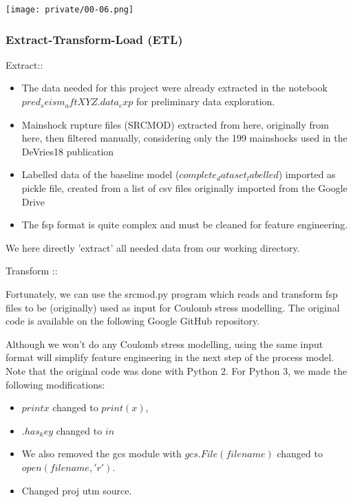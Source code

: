 \documentclass[journal,transmag]{IEEEtran}
\begin{document}
\texttt{[image: private/00-06.png]}

\vspace{0.5em}
\subsubsection{Extract-Transform-Load (ETL)}
\vspace{0.5em}

Extract::

\begin{itemize}
  \item \par The data needed for this project were already extracted in the notebook $pred_seism_aftXYZ.data_exp$ for preliminary data exploration.
  \item \par Mainshock rupture files (SRCMOD) extracted from here, originally from here, then filtered manually, considering only the 199 mainshocks used in the DeVries18 publication
  \item \par Labelled data of the baseline model ($complete_dataset_labelled$) imported as pickle file, created from a list of csv files originally imported from the Google Drive
  \item The fsp format is quite complex and must be cleaned for feature engineering.
\end{itemize}

We here directly 'extract' all needed data from our working directory.

Transform ::

Fortunately, we can use the srcmod.py program which reads and transform fsp files to be (originally) used as input for Coulomb stress modelling. The original code is available on the following Google GitHub repository.

Although we won't do any Coulomb stress modelling, using the same input format will simplify feature engineering in the next step of the process model. Note that the original code was done with Python 2. For Python 3, we made the following modifications:

\begin{itemize}
  \item \par $print x$ changed to $print(x)$,
  \item \par $.has_key$ changed to $in$
  \item \par We also removed the gcs module with $gcs.File(filename)$ changed to $open(filename, 'r')$.
  \item \par Changed proj utm source.
\end{itemize}
\end{document}
